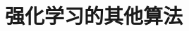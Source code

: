 \setcounter{chapter}{13}

\hypertarget{ux5f3aux5316ux5b66ux4e60ux7684ux5176ux4ed6ux7b97ux6cd5}{%
\chapter{强化学习的其他算法}\label{ux5f3aux5316ux5b66ux4e60ux7684ux5176ux4ed6ux7b97ux6cd5}}
